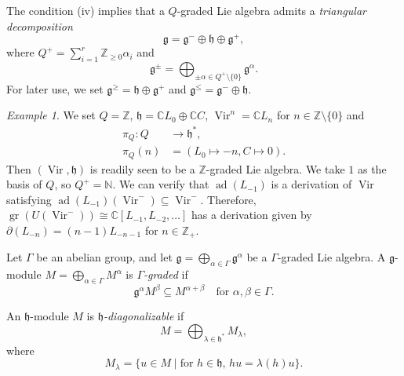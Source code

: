 \documentclass[a4paper, 12pt, reqno]{amsart}
\theoremstyle{remark}
\newtheorem{example}[theorem]{Example}
\DeclareMathOperator{\Vir}{Vir}
\DeclareMathOperator{\gr}{gr}
\DeclareMathOperator{\ad}{ad}
\begin{document}
The condition (iv) implies that a $Q$-graded Lie algebra admits a \emph{triangular decomposition}
\begin{equation*}
  \mathfrak{g} = \mathfrak{g}^- \oplus \mathfrak{h} \oplus \mathfrak{g}^+,
\end{equation*}
where $Q^+ = \sum_{i = 1}^r\mathbb{Z}_{\ge 0}\alpha_i$ and
\begin{equation*}
  \mathfrak{g}^{\pm} = \bigoplus_{\pm \alpha \in Q^+ \setminus \{0\}}\mathfrak{g}^{\alpha}.
\end{equation*}
For later use, we set $\mathfrak{g}^{\ge} = \mathfrak{h} \oplus \mathfrak{g}^+$ and $\mathfrak{g}^{\le} = \mathfrak{g}^- \oplus \mathfrak{h}$.

\begin{example}
  \label{exa:2}
  We set $Q = \mathbb{Z}$, $\mathfrak{h} = \mathbb{C}L_0 \oplus \mathbb{C}C$, $\Vir^n = \mathbb{C}L_n$ for $n \in \mathbb{Z} \setminus \{0\}$ and
  \begin{align*}
    \pi_Q: Q &\to \mathfrak{h}^*, \\
    \pi_Q(n) &= (L_0 \mapsto -n, C \mapsto 0).
  \end{align*}
  Then $(\Vir, \mathfrak{h})$ is readily seen to be a $\mathbb{Z}$-graded Lie algebra.
  We take $1$ as the basis of $Q$, so $Q^+ = \mathbb{N}$.
  We can verify that $\ad(L_{-1})$ is a derivation of $\Vir$ satisfying $\ad(L_{-1})(\Vir^-) \subseteq \Vir^-$.
  Therefore, $\gr(U(\Vir^-)) \cong \mathbb{C}[L_{-1}, L_{-2}, \dots]$ has a derivation given by $\partial(L_{-n}) = (n - 1)L_{-n - 1}$ for $n \in \mathbb{Z}_+$.
\end{example}

Let $\Gamma$ be an abelian group, and let $\mathfrak{g} = \bigoplus_{\alpha \in \Gamma}\mathfrak{g}^{\alpha}$ be a $\Gamma$-graded Lie algebra.
A $\mathfrak{g}$-module $M = \bigoplus_{\alpha \in \Gamma}M^{\alpha}$ is \emph{$\Gamma$-graded} if
\begin{equation*}
  \mathfrak{g}^{\alpha}M^{\beta} \subseteq M^{\alpha + \beta} \quad \text{for $\alpha, \beta \in \Gamma$}.
\end{equation*}

An $\mathfrak{h}$-module $M$ is \emph{$\mathfrak{h}$-diagonalizable} if
\begin{equation*}
  M = \bigoplus_{\lambda \in \mathfrak{h}^*}M_{\lambda},
\end{equation*}
where
\begin{equation*}
  M_{\lambda} = \{u \in M \mid \text{for $h \in \mathfrak{h}$, $hu = \lambda(h)u$}\}.
\end{equation*}
\end{document}

